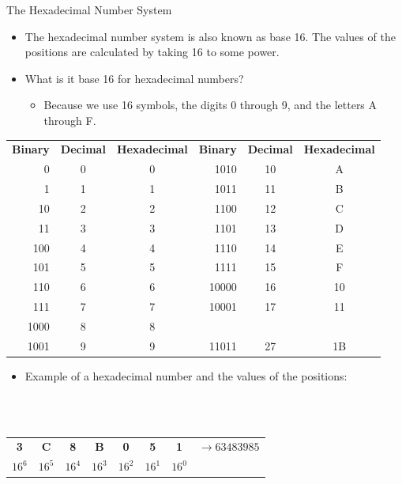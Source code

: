 \documentclass[graphics]{beamer}
\newcommand*{\thead}[1]{\multicolumn{1}{c}{\bfseries #1}}
\begin{document}
\begin{frame}{The Hexadecimal Number System}
     {
        \begin{itemize}
            \item The hexadecimal number system is also known as base 16. The values of the positions are calculated by taking 16 to some power.
            \item What is it base 16 for hexadecimal numbers?
            \begin{itemize}
                \item Because we use 16 symbols, the digits 0 through 9, and the letters A through F.
            \end{itemize}
        \end{itemize}
    }
     {
        \begin{tabular}{r c c | r c c}
             \thead{Binary} & \thead{Decimal} & \thead{Hexadecimal} & \thead{Binary} & \thead{Decimal} & \thead{Hexadecimal}  \\
             0    & 0 & 0 & 1010 & 10 & A \\
             1    & 1 & 1 & 1011 & 11 & B \\
             10   & 2 & 2 & 1100 & 12 & C \\
             11   & 3 & 3 & 1101 & 13 & D \\
             100  & 4 & 4 & 1110 & 14 & E \\
             101  & 5 & 5 & 1111 & 15 & F \\
             110  & 6 & 6 & 10000 & 16 & 10 \\
             111  & 7 & 7 & 10001 & 17 & 11 \\
             1000 & 8 & 8 &       &    & \\
             1001 & 9 & 9 & 11011 & 27 & 1B
        \end{tabular}
    }
     {
        \begin{itemize}
            \item Example of a hexadecimal number and the values of the positions:
        \end{itemize}
        \\ ~~ \\
        \begin{tabular}{c c c c c c c c}
             \thead{3} & \thead{C} & \thead{8} & \thead{B} & \thead{0} & \thead{5} & \thead{1} & $\rightarrow63483985$ \\
             $16^6$ & $16^5$ & $16^4$ & $16^3$ & $16^2$ & $16^1$ & $16^0$ & 
        \end{tabular}
    }
\end{frame}
\end{document}
